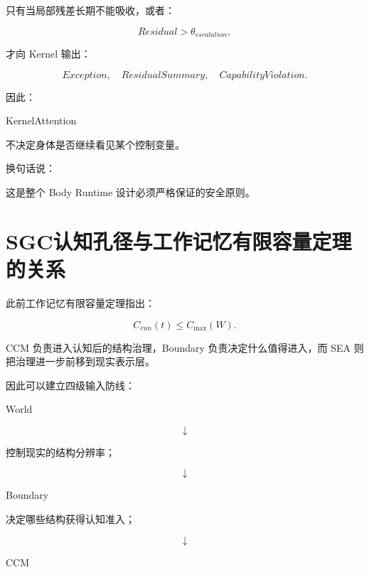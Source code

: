 只有当局部残差长期不能吸收，或者：

\[
Residual>\theta_{escalation},
\]

才向 Kernel 输出：

\[
Exception,
\quad
ResidualSummary,
\quad
CapabilityViolation.
\]

因此：

\begin{statementbox}
KernelAttention
\end{statementbox}

不决定身体是否继续看见某个控制变量。

换句话说：

\begin{statementbox}
\centering
{}
\end{statementbox}

这是整个 Body Runtime 设计必须严格保证的安全原则。

\section{SGC认知孔径与工作记忆有限容量定理的关系}

此前工作记忆有限容量定理指出：

\[
C_{run}(t)
\le
C_{\max}(W).
\]

CCM 负责进入认知后的结构治理，Boundary 负责决定什么值得进入，而 SEA 则把治理进一步前移到现实表示层。

因此可以建立四级输入防线：

\begin{statementbox}
World
\end{statementbox}

\[
\downarrow
\]

\begin{statementbox}
\centering
{}
\end{statementbox}

控制现实的结构分辨率；

\[
\downarrow
\]

\begin{statementbox}
Boundary
\end{statementbox}

决定哪些结构获得认知准入；

\[
\downarrow
\]

\begin{statementbox}
CCM
\end{statementbox}

